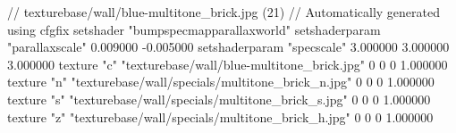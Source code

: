 // texturebase/wall/blue-multitone_brick.jpg (21)
// Automatically generated using cfgfix
setshader "bumpspecmapparallaxworld"
setshaderparam "parallaxscale" 0.009000 -0.005000
setshaderparam "specscale" 3.000000 3.000000 3.000000
texture "c" "texturebase/wall/blue-multitone_brick.jpg" 0 0 0 1.000000
texture "n" "texturebase/wall/specials/multitone_brick_n.jpg" 0 0 0 1.000000
texture "s" "texturebase/wall/specials/multitone_brick_s.jpg" 0 0 0 1.000000
texture "z" "texturebase/wall/specials/multitone_brick_h.jpg" 0 0 0 1.000000
